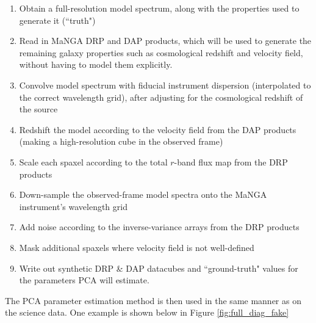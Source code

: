 \begin{enumerate}
    \itemsep0em
    \item Obtain a full-resolution model spectrum, along with the properties used to generate it (``truth")
    \item Read in MaNGA DRP and DAP products, which will be used to generate the remaining galaxy properties such as cosmological redshift and velocity field, without having to model them explicitly.
    \item Convolve model spectrum with fiducial instrument dispersion (interpolated to the correct wavelength grid), after adjusting for the cosmological redshift of the source \citep{cappellari_17}
    \item Redshift the model according to the velocity field from the DAP products (making a high-resolution cube in the observed frame)
    \item Scale each spaxel according to the total $r$-band flux map from the DRP products
    \item Down-sample the observed-frame model spectra onto the MaNGA instrument's wavelength grid
    \item Add noise according to the inverse-variance arrays from the DRP products
    \item Mask additional spaxels where velocity field is not well-defined
    \item Write out synthetic DRP \& DAP datacubes and ``ground-truth" values for the parameters PCA will estimate.    
\end{enumerate}

The PCA parameter estimation method is then used in the same manner as on the science data. One example is shown below in Figure \ref{fig:full_diag_fake}

